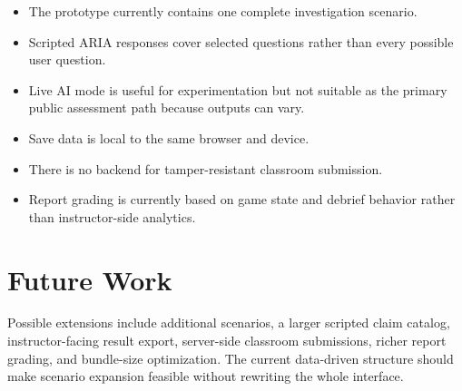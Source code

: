\begin{itemize}[leftmargin=*]
  \item The prototype currently contains one complete investigation scenario.
  \item Scripted ARIA responses cover selected questions rather than every possible user question.
  \item Live AI mode is useful for experimentation but not suitable as the primary public assessment path because outputs can vary.
  \item Save data is local to the same browser and device.
  \item There is no backend for tamper-resistant classroom submission.
  \item Report grading is currently based on game state and debrief behavior rather than instructor-side analytics.
\end{itemize}

\section{Future Work}

Possible extensions include additional scenarios, a larger scripted claim catalog, instructor-facing result export, server-side classroom submissions, richer report grading, and bundle-size optimization. The current data-driven structure should make scenario expansion feasible without rewriting the whole interface.
